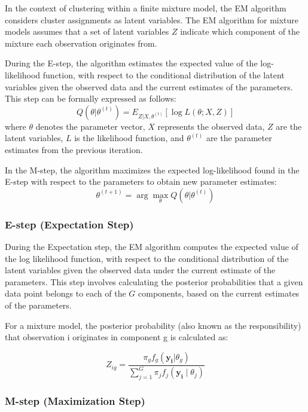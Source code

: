 \documentclass{article}
\begin{document}
In the context of clustering within a finite mixture model, the EM algorithm considers cluster assignments as latent variables. 
The EM algorithm for mixture models assumes that a set of latent variables $Z$ indicate which component of the mixture each observation originates from.

During the E-step, the algorithm estimates the expected value of the log-likelihood function, with respect to the conditional distribution of the latent variables given the observed data and the current estimates of the parameters. This step can be formally expressed as follows:
\begin{equation}
Q(\theta | \theta^{(t)}) = E_{Z|X,\theta^{(t)}}[\log L(\theta; X, Z)]
\end{equation}
where \( \theta \) denotes the parameter vector, \( X \) represents the observed data, \( Z \) are the latent variables, \( L \) is the likelihood function, and \( \theta^{(t)} \) are the parameter estimates from the previous iteration.

In the M-step, the algorithm maximizes the expected log-likelihood found in the E-step with respect to the parameters to obtain new parameter estimates:
\begin{equation}
\theta^{(t+1)} = \arg \max_{\theta} Q(\theta | \theta^{(t)})
\end{equation}

\subsubsection{E-step (Expectation Step)}

During the Expectation step, the EM algorithm computes the expected value of the log likelihood function, with respect to the conditional distribution of the latent variables given the observed data under the current estimate of the parameters. This step involves calculating the posterior probabilities that a given data point belongs to each of the $G$ components, based on the current estimates of the parameters.

For a mixture model, the posterior probability (also known as the responsibility) that observation i originates in component g is calculated as:

\begin{equation}
Z_{ig} = \frac{\pi_g f_g(\mathbf{y_i}|\theta_g)}{\sum_{j=1}^{G} \pi_j f_j(\mathbf{y_i} \mid \theta_j)}
\end{equation}

\subsubsection{M-step (Maximization Step)}
\end{document}
